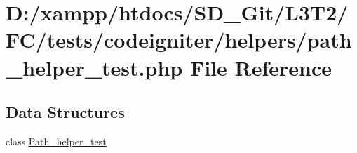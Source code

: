 \hypertarget{tests_2codeigniter_2helpers_2path__helper__test_8php}{}\section{D\+:/xampp/htdocs/\+S\+D\+\_\+\+Git/\+L3\+T2/\+F\+C/tests/codeigniter/helpers/path\+\_\+helper\+\_\+test.php File Reference}
\label{tests_2codeigniter_2helpers_2path__helper__test_8php}
\subsection*{Data Structures}
\begin{DoxyCompactItemize}
\item 
class \hyperlink{class_path__helper__test}{Path\+\_\+helper\+\_\+test}
\end{DoxyCompactItemize}
